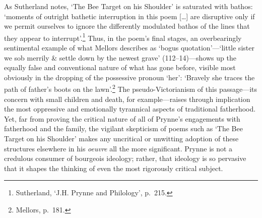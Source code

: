 \documentclass[]{article}
\begin{document}
\noindent As Sutherland notes, ‘The Bee Target on his Shoulder’ is
saturated with bathos: ‘moments of outright bathetic interruption in
this poem {[}\ldots{}{]} are disruptive only if we permit ourselves to
ignore the differently modulated bathos of the lines that they appear to
interrupt’.\footnote{Sutherland, ‘J.H. Prynne and Philology’, p.~215.}
Thus, in the poem’s final stages, an overbearingly sentimental example
of what Mellors describes as ‘bogus quotation’—‘little \textbar{} sister
we sob merrily \& settle down \textbar{} by the newest grave’
(112–14)—shows up the equally false and conventional nature of what has
gone before, visible most obviously in the dropping of the possessive
pronoun ‘her’: ‘Bravely she traces \textbar{} the path of father’s boots
\textbar{} on the lawn’.\footnote{Mellors, p.~181.} The
pseudo-Victorianism of this passage—its concern with small children and
death, for example—raises through implication the most oppressive and
emotionally tyrannical aspects of traditional fatherhood. Yet, far from
proving the critical nature of all of Prynne’s engagements with
fatherhood and the family, the vigilant skepticism of poems such as ‘The
Bee Target on his Shoulder’ makes any uncritical or unwitting adoption
of these structures elsewhere in his \emph{oeuvre} all the more
significant. Prynne is not a credulous consumer of bourgeois ideology;
rather, that ideology is so pervasive that it shapes the thinking of
even the most rigorously critical subject.
\end{document}
